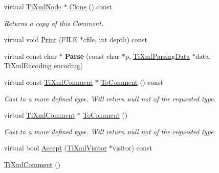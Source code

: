 \begin{DoxyCompactItemize}
\item 
\hypertarget{class_ti_xml_comment_a4f6590c9c9a2b63a48972655b78eb853}{virtual \hyperlink{class_ti_xml_node}{Ti\+Xml\+Node} $\ast$ \hyperlink{class_ti_xml_comment_a4f6590c9c9a2b63a48972655b78eb853}{Clone} () const }\label{class_ti_xml_comment_a4f6590c9c9a2b63a48972655b78eb853}

\begin{DoxyCompactList}\small\item\em Returns a copy of this Comment. \end{DoxyCompactList}\item 
virtual void \hyperlink{class_ti_xml_comment_a17398061d62c470f57801ce28fa33ad4}{Print} (F\+I\+L\+E $\ast$cfile, int depth) const 
\item 
\hypertarget{class_ti_xml_comment_a43bddc18ac057734b41d84653b71d3e0}{virtual const char $\ast$ {\bfseries Parse} (const char $\ast$p, \hyperlink{class_ti_xml_parsing_data}{Ti\+Xml\+Parsing\+Data} $\ast$data, Ti\+Xml\+Encoding encoding)}\label{class_ti_xml_comment_a43bddc18ac057734b41d84653b71d3e0}

\item 
\hypertarget{class_ti_xml_comment_a00fb4215c20a2399ea05ac9b9e7e68a0}{virtual const \hyperlink{class_ti_xml_comment}{Ti\+Xml\+Comment} $\ast$ \hyperlink{class_ti_xml_comment_a00fb4215c20a2399ea05ac9b9e7e68a0}{To\+Comment} () const }\label{class_ti_xml_comment_a00fb4215c20a2399ea05ac9b9e7e68a0}

\begin{DoxyCompactList}\small\item\em Cast to a more defined type. Will return null not of the requested type. \end{DoxyCompactList}\item 
\hypertarget{class_ti_xml_comment_acc7c7e07e13c23f17797d642981511df}{virtual \hyperlink{class_ti_xml_comment}{Ti\+Xml\+Comment} $\ast$ \hyperlink{class_ti_xml_comment_acc7c7e07e13c23f17797d642981511df}{To\+Comment} ()}\label{class_ti_xml_comment_acc7c7e07e13c23f17797d642981511df}

\begin{DoxyCompactList}\small\item\em Cast to a more defined type. Will return null not of the requested type. \end{DoxyCompactList}\item 
virtual bool \hyperlink{class_ti_xml_comment_a4382de0e50da973f11a23ea5852568bd}{Accept} (\hyperlink{class_ti_xml_visitor}{Ti\+Xml\+Visitor} $\ast$visitor) const 
\item 
\hypertarget{class_ti_xml_comment_aaa3252031d3e8bd3a2bf51a1c61201b7}{\hyperlink{class_ti_xml_comment_aaa3252031d3e8bd3a2bf51a1c61201b7}{Ti\+Xml\+Comment} ()}\label{class_ti_xml_comment_aaa3252031d3e8bd3a2bf51a1c61201b7}


\end{DoxyCompactItemize}

